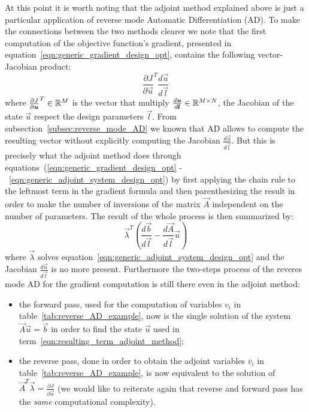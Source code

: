 \bigskip
At this point it is worth noting that the adjoint method explained above is just a particular application of reverse mode Automatic Differentiation (AD). To make the connections between the two methods clearer we note that the first computation of the  objective function's gradient, presented in equation~\eqref{eqn:generic_gradient_design_opt}, contains the following vector-Jacobian product:
\begin{equation}
	\label{eqn:vJp_design_opt}
	\frac{\partial J}{\partial \vec{u}}^T \frac{d\vec{u}}{d\vec{l}}
\end{equation}
where $\frac{\partial J}{\partial \boldsymbol{u}}^T \in \mathbb{R}^M$ is the vector that multiply $\frac{d\boldsymbol{u}}{d\boldsymbol{l}} \in \mathbb{R}^{M \times N}$, the Jacobian of the state $\vec{u}$ respect the design parameters $\vec{l}$.
From subsection~\vref{subsec:reverse_mode_AD} we known that AD allows to compute the resulting vector without explicitly computing the Jacobian $\frac{d\vec{u}}{d\vec{l}}$. But this is precisely what the adjoint method does through equations~(\ref{eqn:generic_gradient_design_opt} -~\ref{eqn:generic_adjoint_system_design_opt}) by first applying the chain rule to the leftmost term in the gradient formula and then parenthesizing the result in order to make the number of inversions of the matrix $\vec{A}$ independent on the number of parameters.
The result of the whole process is then summarized by:
\begin{equation}
	\label{eqn:resulting_term_adjoint_method}
	\vec{\lambda}^T \left( \frac{d\vec{b}}{d\vec{l}} - \frac{d\vec{A}}{d\vec{l}}\vec{u} \right)
\end{equation}
where $\vec{\lambda}$ solves equation~\eqref{eqn:generic_adjoint_system_design_opt} and the Jacobian $\frac{d\vec{u}}{d\vec{l}}$ is no more present. Furthermore the two-steps process of the reveres mode AD for the gradient computation is still there even in the adjoint method:
\begin{itemize}
	\item the forward pass, used for the computation of variables $v_i$ in table~\vref{tab:reverse_AD_example}, now is the single solution of the system $\vec{A}\vec{u}=\vec{b}$ in order to find the state $\vec{u}$ used in term~\eqref{eqn:resulting_term_adjoint_method};
	\item the reverse pass, done in order to obtain the adjoint variables $\overline{v}_i$ in table~\ref{tab:reverse_AD_example}, is now equivalent to the solution of $\vec{A}^T \vec{\lambda} = \frac{\partial J}{\partial \vec{u}}$ (we would like to reiterate again that reverse and forward pass has the \emph{same} computational complexity). 
\end{itemize}

